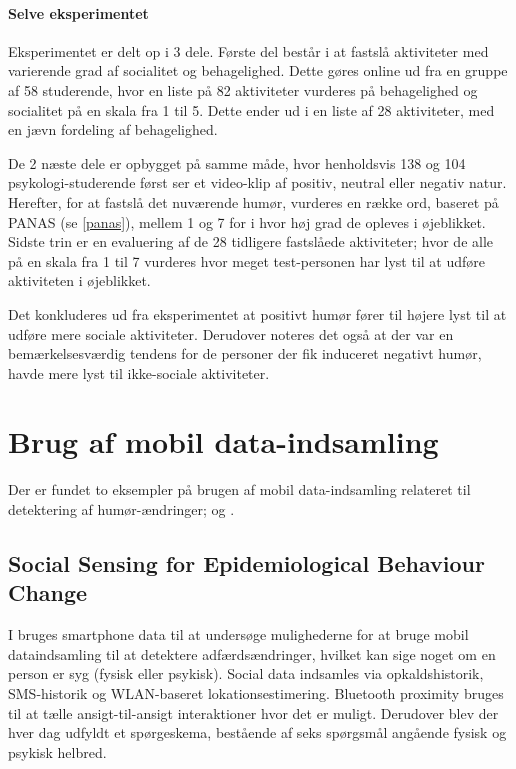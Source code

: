 \paragraph{Selve eksperimentet} 
Eksperimentet er delt op i 3 dele.
Første del består i at fastslå aktiviteter med varierende grad af socialitet og behagelighed.
Dette gøres online ud fra en gruppe af 58 studerende, hvor en liste på 82 aktiviteter vurderes på behagelighed og socialitet på en skala fra 1 til 5.
Dette ender ud i en liste af 28 aktiviteter, med en jævn fordeling af behagelighed.

De 2 næste dele er opbygget på samme måde, hvor henholdsvis 138 og 104 psykologi-studerende først ser et video-klip af positiv, neutral eller negativ natur.
Herefter, for at fastslå det nuværende humør, vurderes en række ord, baseret på PANAS (se \cref{panas}), mellem 1 og 7 for i hvor høj grad de opleves i øjeblikket.
Sidste trin er en evaluering af de 28 tidligere fastslåede aktiviteter; hvor de alle på en skala fra 1 til 7 vurderes hvor meget test-personen har lyst til at udføre aktiviteten i øjeblikket.

Det konkluderes ud fra eksperimentet at positivt humør fører til højere lyst til at udføre mere sociale aktiviteter.
Derudover noteres det også at der var en bemærkelsesværdig tendens for de personer der fik induceret negativt humør, havde mere lyst til ikke-sociale aktiviteter.

\section{Brug af mobil data-indsamling}
Der er fundet to eksempler på brugen af mobil data-indsamling relateret til detektering af humør-ændringer; \citet{social_sensing} og \citet{social_sensing_2}.

\subsection{Social Sensing for Epidemiological Behaviour Change}
I \citet{social_sensing} bruges smartphone data til at undersøge mulighederne for at bruge mobil dataindsamling til at detektere adfærdsændringer, hvilket kan sige noget om en person er syg (fysisk eller psykisk).
Social data indsamles via opkaldshistorik, SMS-historik og WLAN-baseret lokationsestimering.
Bluetooth proximity bruges til at tælle ansigt-til-ansigt interaktioner hvor det er muligt. 
Derudover blev der hver dag udfyldt et spørgeskema, bestående af seks spørgsmål angående fysisk og psykisk helbred.

